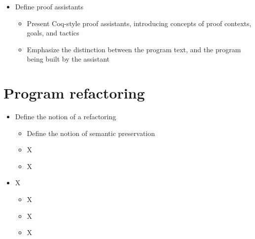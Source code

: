 \begin{itemize}

  \item Define proof assistants

        \begin{itemize}

          \item Present Coq-style proof assistants, introducing concepts of
proof contexts, goals, and tactics

          \item Emphasize the distinction between the program text, and the
program being built by the assistant

        \end{itemize}

\end{itemize}

\section{Program refactoring}

\begin{itemize}

  \item Define the notion of a refactoring

        \begin{itemize}

          \item Define the notion of semantic preservation

          \item X

          \item X

        \end{itemize}

  \item X

        \begin{itemize}

          \item X

          \item X

          \item X

        \end{itemize}

\end{itemize}
